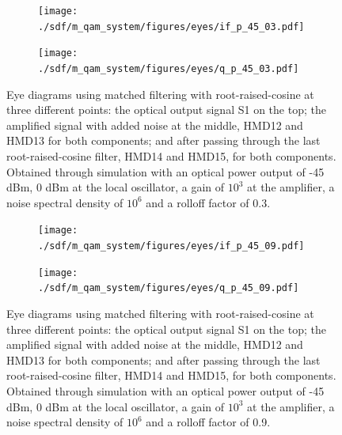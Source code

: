 	\begin{figure}[H]
		\centering
		\begin{subfigure}{.45\textwidth}
			\centering
			\texttt{[image: ./sdf/m\_qam\_system/figures/eyes/if\_p\_45\_03.pdf]}
		\end{subfigure}
		\begin{subfigure}{.45\textwidth}
			\centering
			\texttt{[image: ./sdf/m\_qam\_system/figures/eyes/q\_p\_45\_03.pdf]}
		\end{subfigure}
		
		\caption{Eye diagrams using matched filtering with root-raised-cosine at three different points: the optical output signal S1 on the top; the amplified signal with added noise at the middle, HMD12 and HMD13 for both components; and after passing through the last root-raised-cosine filter, HMD14 and HMD15, for both components. Obtained through simulation with an optical power output of -45 dBm, 0 dBm at the local oscillator, a gain of $10^3$ at the amplifier, a noise spectral density of $10^6$ and a rolloff factor of 0.3.}
		\label{fig:test}
	\end{figure}
		\begin{figure}[H]
			\centering
			\begin{subfigure}{.45\textwidth}
				\centering
				\texttt{[image: ./sdf/m\_qam\_system/figures/eyes/if\_p\_45\_09.pdf]}
			\end{subfigure}
			\begin{subfigure}{.45\textwidth}
				\centering
				\texttt{[image: ./sdf/m\_qam\_system/figures/eyes/q\_p\_45\_09.pdf]}
			\end{subfigure}
			
			\caption{Eye diagrams using matched filtering with root-raised-cosine at three different points: the optical output signal S1 on the top; the amplified signal with added noise at the middle, HMD12 and HMD13 for both components; and after passing through the last root-raised-cosine filter, HMD14 and HMD15, for both components. Obtained through simulation with an optical power output of -45 dBm, 0 dBm at the local oscillator, a gain of $10^3$ at the amplifier, a noise spectral density of $10^6$ and a rolloff factor of 0.9.}
			\label{fig:test}
	
\end{figure}

